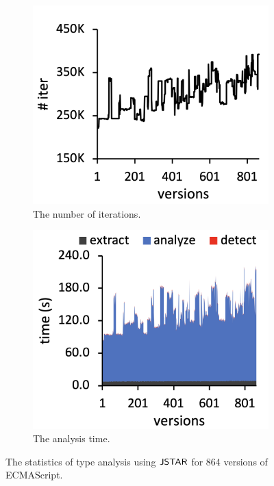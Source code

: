 \begin{figure}
\begin{subfigure}[b]{0.24\textwidth}
    \includegraphics[width=\textwidth]{img/iter}
    \caption{The number of iterations.}
  \end{subfigure}
  \begin{subfigure}[b]{0.24\textwidth}
    \includegraphics[width=\textwidth]{img/time}
    \caption{The analysis time.}
  \end{subfigure}
  \caption{The statistics of type analysis using $\tool$ for 864 versions of
  ECMAScript.}
  \vspace*{-1.5em}
  \label{fig:stat}
\end{figure}


